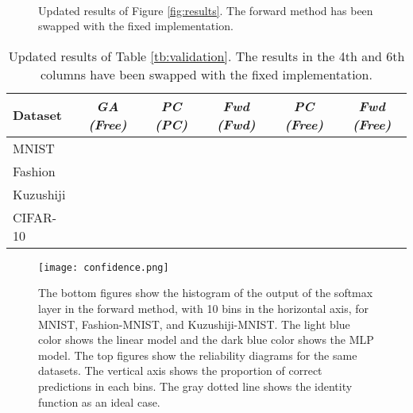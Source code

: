 \documentclass{article}
\begin{document}
\begin{figure*}[h]
\vspace{-5mm}
\centering
{}
\hspace{0.001\textwidth}
\hspace{0.001\textwidth}
\hspace{0.001\textwidth}
\\
\vspace{-3mm}
\hspace{0.001\textwidth}
\hspace{0.001\textwidth}
\hspace{0.001\textwidth}
\caption{Updated results of Figure \ref{fig:results}.  The forward method has been swapped with the fixed implementation.}
\label{fig:updatedresults}
\end{figure*}
\begin{table*}[h] 
  \center
  \small
  \caption{Updated results of Table \ref{tb:validation}.  The results in the 4th and 6th columns have been swapped with the fixed implementation.}
  \label{tb:validation2}
  \tabcolsep=0.2cm
    \begin{tabular}{l|ccc|cc}\toprule
    Dataset & \emph{GA (Free)} & \emph{PC (PC)} & \emph{Fwd (Fwd)} & \emph{PC (Free)} & \emph{Fwd (Free)} \\\midrule
    MNIST&&&&&\\\midrule
    Fashion&&&&& \\\midrule
    Kuzushiji&&&&& \\\midrule
    CIFAR-10&&&&& \\\bottomrule
  \end{tabular}
\end{table*}
\begin{figure*}[h]
\centering
  \centering
  \texttt{[image: confidence.png]}
  \caption{The bottom figures show the histogram of the output of the softmax layer in the forward method, with 10 bins in the horizontal axis, for MNIST, Fashion-MNIST, and Kuzushiji-MNIST.  The light blue color shows the linear model and the dark blue color shows the MLP model.  The top figures show the reliability diagrams for the same datasets.  The vertical axis shows the proportion of correct predictions in each bins.  The gray dotted line shows the identity function as an ideal case.}
  \label{fig:conf}
\end{figure*}
\end{document}
